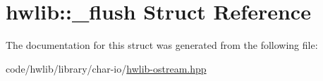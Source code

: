 \hypertarget{structhwlib_1_1__flush}{}\section{hwlib\+:\+:\+\_\+flush Struct Reference}
\label{structhwlib_1_1__flush}


The documentation for this struct was generated from the following file\+:\begin{DoxyCompactItemize}
\item 
code/hwlib/library/char-\/io/\hyperlink{hwlib-ostream_8hpp}{hwlib-\/ostream.\+hpp}\end{DoxyCompactItemize}
